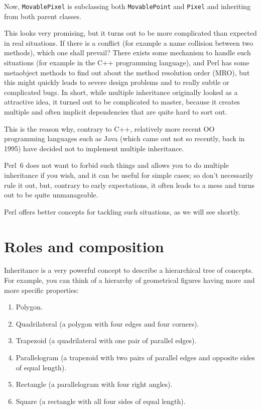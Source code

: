 Now, {\tt MovablePixel} is subclassing both 
{\tt MovablePoint} and {\tt Pixel} and inheriting 
from both parent classes.

This looks very promising, but it turns out to be more 
complicated than expected in real situations. If there is a 
conflict (for example a name collision between two methods), 
which one shall prevail? There exists some mechanism to 
handle such situations (for example in the C++ programming 
language), and Perl has some metaobject methods to find out 
about the method resolution order (MRO), but this 
might quickly leads to severe design 
problems and to really subtle or complicated bugs. In 
short, while multiple inheritance originally looked as a 
attractive idea, it turned out to be complicated to master, 
because it creates multiple and often implicit dependencies 
that are quite hard to sort out.

This is the reason why, contrary to C++, relatively more recent 
OO programming languages such as Java (which came out not 
so recently, back in 1995) have decided not to implement 
multiple inheritance.

Perl~6 does not want to forbid such things and allows you 
to do multiple inheritance if you wish, and it can be useful 
for simple cases; so don't necessarily rule it out, but, 
contrary to early expectations, it often leads to a mess and
turns out to be quite unmanageable.

Perl offers better concepts for tackling such situations,
as we will see shortly.

\section{Roles and composition}

Inheritance is a very powerful concept to describe a hierarchical 
tree of concepts. For example, you can think of a hierarchy of 
geometrical figures having more and more specific properties: 
\begin{enumerate}
\item Polygon.

\item Quadrilateral (a polygon with four edges and four corners).

\item Trapezoid (a quadrilateral with one pair of parallel edges).

\item Parallelogram (a trapezoid with two pairs of parallel 
edges and opposite sides of equal length).

\item Rectangle (a parallelogram with four right angles).

\item Square (a rectangle with all four sides of equal length).
\end{enumerate}

